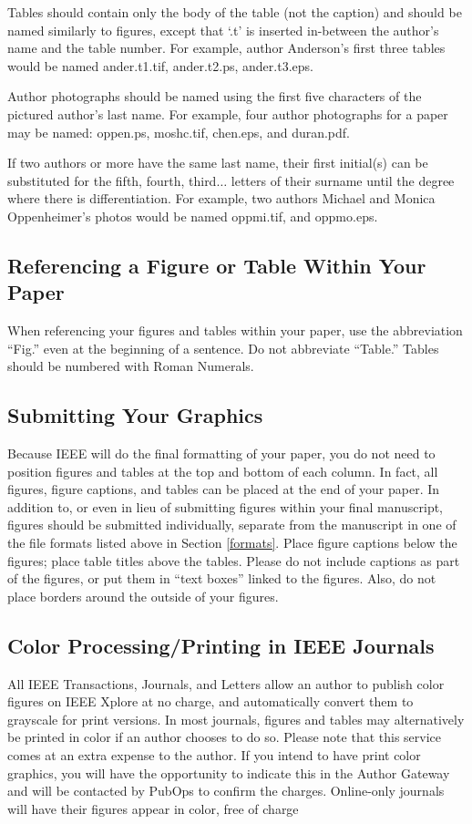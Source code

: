 \documentclass[journal,twoside,web]{ieeecolor}
\begin{document}
Tables should contain only the body of the table (not the caption) and 
should be named similarly to figures, except that `.t' is inserted 
in-between the author's name and the table number. For example, author 
Anderson's first three tables would be named ander.t1.tif, ander.t2.ps, 
ander.t3.eps.

Author photographs should be named using the first five characters of the 
pictured author's last name. For example, four author photographs for a 
paper may be named: oppen.ps, moshc.tif, chen.eps, and duran.pdf.

If two authors or more have the same last name, their first initial(s) can 
be substituted for the fifth, fourth, third$\ldots$ letters of their surname 
until the degree where there is differentiation. For example, two authors 
Michael and Monica Oppenheimer's photos would be named oppmi.tif, and 
oppmo.eps.

\subsection{Referencing a Figure or Table Within Your Paper}
When referencing your figures and tables within your paper, use the 
abbreviation ``Fig.'' even at the beginning of a sentence. Do not abbreviate 
``Table.'' Tables should be numbered with Roman Numerals.

\subsection{Submitting Your Graphics}
Because IEEE will do the final formatting of your paper,
you do not need to position figures and tables at the top and bottom of each 
column. In fact, all figures, figure captions, and tables can be placed at 
the end of your paper. In addition to, or even in lieu of submitting figures 
within your final manuscript, figures should be submitted individually, 
separate from the manuscript in one of the file formats listed above in 
Section \ref{formats}. Place figure captions below the figures; place table titles 
above the tables. Please do not include captions as part of the figures, or 
put them in ``text boxes'' linked to the figures. Also, do not place borders 
around the outside of your figures.

\subsection{Color Processing/Printing in IEEE Journals}
All IEEE Transactions, Journals, and Letters allow an author to publish color figures on IEEE Xplore at no charge, and automatically convert them to grayscale for print versions. In most journals, figures and tables may alternatively be printed in color if an author chooses to do so. Please note that this service comes at an extra expense to the author. If you intend to have print color graphics, you will have the opportunity to indicate this in the Author Gateway and will be contacted by PubOps to confirm the charges. Online-only journals will have their figures appear in color, free of charge 
\end{document}
